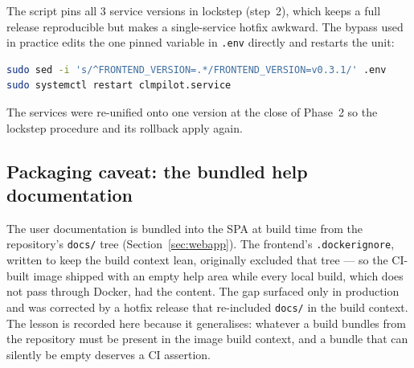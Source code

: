 The script pins all 3 service versions in lockstep (step~2), which
keeps a full release reproducible but makes a single-service hotfix
awkward. The bypass used in practice edits the one pinned variable in
\texttt{.env} directly and restarts the unit:

\begin{lstlisting}[language=bash]
sudo sed -i 's/^FRONTEND_VERSION=.*/FRONTEND_VERSION=v0.3.1/' .env
sudo systemctl restart clmpilot.service
\end{lstlisting}

The services were re-unified onto one version at the close of Phase~2
so the lockstep procedure and its rollback apply again.

\subsection{Packaging caveat: the bundled help documentation}

The user documentation is bundled into the SPA at build time from the
repository's \texttt{docs/} tree (Section~\ref{sec:webapp}). The frontend's
\texttt{.dockerignore}, written to keep the build context lean,
originally excluded that tree --- so the CI-built image shipped with an
empty help area while every local build, which does not pass through
Docker, had the content. The gap surfaced only in production and was
corrected by a hotfix release that re-included \texttt{docs/} in the
build context. The lesson is recorded here because it generalises:
whatever a build bundles from the repository must be present in the
image build context, and a bundle that can silently be empty deserves a
CI assertion.

\par
\endgroup
